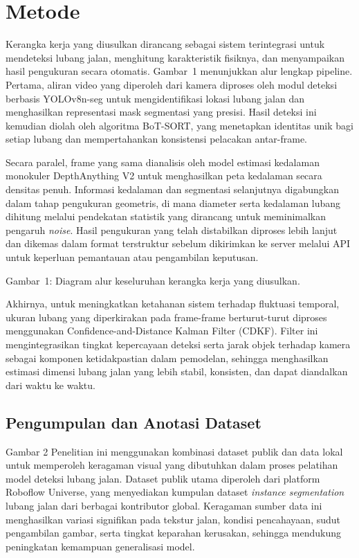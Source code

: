 \section{Metode}

Kerangka kerja yang diusulkan dirancang sebagai sistem terintegrasi untuk mendeteksi lubang jalan, menghitung karakteristik fisiknya, dan menyampaikan hasil pengukuran secara otomatis. Gambar~1 menunjukkan alur lengkap pipeline. Pertama, aliran video yang diperoleh dari kamera diproses oleh modul deteksi berbasis YOLOv8n-seg untuk mengidentifikasi lokasi lubang jalan dan menghasilkan representasi mask segmentasi yang presisi. Hasil deteksi ini kemudian diolah oleh algoritma BoT-SORT, yang menetapkan identitas unik bagi setiap lubang dan mempertahankan konsistensi pelacakan antar-frame.

Secara paralel, frame yang sama dianalisis oleh model estimasi kedalaman monokuler DepthAnything V2 untuk menghasilkan peta kedalaman secara densitas penuh. Informasi kedalaman dan segmentasi selanjutnya digabungkan dalam tahap pengukuran geometris, di mana diameter serta kedalaman lubang dihitung melalui pendekatan statistik yang dirancang untuk meminimalkan pengaruh \textit{noise}. Hasil pengukuran yang telah distabilkan diproses lebih lanjut dan dikemas dalam format terstruktur sebelum dikirimkan ke server melalui API untuk keperluan pemantauan atau pengambilan keputusan.

Gambar~1: Diagram alur keseluruhan kerangka kerja yang diusulkan.

Akhirnya, untuk meningkatkan ketahanan sistem terhadap fluktuasi temporal, ukuran lubang yang diperkirakan pada frame-frame berturut-turut diproses menggunakan Confidence-and-Distance Kalman Filter (CDKF). Filter ini mengintegrasikan tingkat kepercayaan deteksi serta jarak objek terhadap kamera sebagai komponen ketidakpastian dalam pemodelan, sehingga menghasilkan estimasi dimensi lubang jalan yang lebih stabil, konsisten, dan dapat diandalkan dari waktu ke waktu.


\subsection{Pengumpulan dan Anotasi Dataset}

Gambar 2
Penelitian ini menggunakan kombinasi dataset publik dan data lokal untuk memperoleh keragaman visual yang dibutuhkan dalam proses pelatihan model deteksi lubang jalan. Dataset publik utama diperoleh dari platform Roboflow Universe, yang menyediakan kumpulan dataset \textit{instance segmentation} lubang jalan dari berbagai kontributor global. Keragaman sumber data ini menghasilkan variasi signifikan pada tekstur jalan, kondisi pencahayaan, sudut pengambilan gambar, serta tingkat keparahan kerusakan, sehingga mendukung peningkatan kemampuan generalisasi model.

